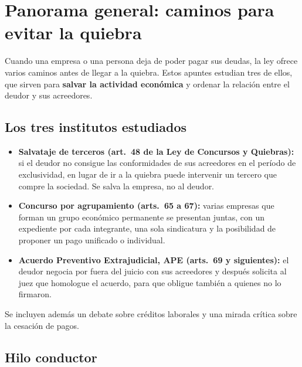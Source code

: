 \documentclass[12pt,oneside]{book}
\begin{document}
\tableofcontents


\chapter[Panorama general]{Panorama general: caminos para evitar la quiebra}

Cuando una empresa o una persona deja de poder pagar sus deudas, la ley ofrece varios caminos antes de llegar a la quiebra. Estos apuntes estudian tres de ellos, que sirven para \textbf{salvar la actividad económica} y ordenar la relación entre el deudor y sus acreedores.

\section{Los tres institutos estudiados}

\begin{itemize}
    \item \textbf{Salvataje de terceros (art.~48 de la Ley de Concursos y Quiebras):} si el deudor no consigue las conformidades de sus acreedores en el período de exclusividad, en lugar de ir a la quiebra puede intervenir un tercero que compre la sociedad. Se salva la empresa, no al deudor.
    \item \textbf{Concurso por agrupamiento (arts.~65 a 67):} varias empresas que forman un grupo económico permanente se presentan juntas, con un expediente por cada integrante, una sola sindicatura y la posibilidad de proponer un pago unificado o individual.
    \item \textbf{Acuerdo Preventivo Extrajudicial, APE (arts.~69 y siguientes):} el deudor negocia por fuera del juicio con sus acreedores y después solicita al juez que homologue el acuerdo, para que obligue también a quienes no lo firmaron.
\end{itemize}

Se incluyen además un debate sobre créditos laborales y una mirada crítica sobre la cesación de pagos.

\section{Hilo conductor}
\end{document}
